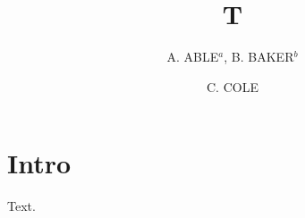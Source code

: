 
\title{T}
\author{A. ABLE$^a$, B. BAKER$^b$}
\address{$^a$Univ X, City}
\address{$^b$Univ Y, Town}
\author{C. COLE}
\address{Univ Z, Burg}
\address{Second Inst, Place}
\maketitle
{}
\section{Intro}
Text.

